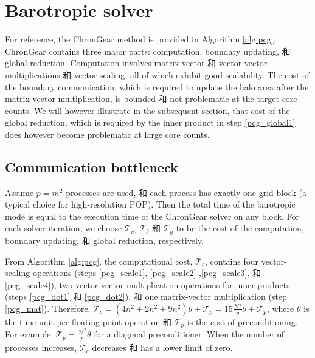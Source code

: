 \section{Barotropic solver} \label{se:baro}
 

 


For reference, the ChronGear method is provided in Algorithm
\ref{alg:pcg}.  ChronGear contains three major parts: computation,
boundary updating, 和 global reduction.  Computation involves
matrix-vector 和 vector-vector multiplications 和 vector scaling,
all of which exhibit good scalability.  The cost of the boundary communication, which
is required to update the halo area after the matrix-vector
multiplication, is bounded 和 not problematic at the target core counts.  We will however illustrate in the subsequent section, that cost of the global reduction, which is required by the inner product in step \ref{pcg_global1} does however become problematic at large core counts.


\subsection{Communication bottleneck}\label{se:bottleneck}
Assume $p=m^2$ processes are used, 和 each process has exactly one
grid block (a typical choice for high-resolution POP). Then the total time of the barotropic mode is equal to the
execution time of the ChronGear solver on any block.  For each solver
iteration, we choose $\mathcal{T}_c$, $\mathcal{T}_b$ 和
$\mathcal{T}_g$ to be the cost of the computation, boundary
updating, 和 global reduction, respectively.


From Algorithm \ref{alg:pcg}, the computational cost,
$\mathcal{T}_c$, contains four vector-scaling operations (steps
\ref{pcg_scale1}, \ref{pcg_scale2} ,\ref{pcg_scale3}, 和
\ref{pcg_scale4}), two vector-vector multiplication operations for
inner products (steps \ref{pcg_dot1} 和 \ref{pcg_dot2}), 和 one
matrix-vector multiplication (step \ref{pcg_mat}).  Therefore,
$\mathcal{T}_c= (4 n^2 +2n^2+ 9n^2)\theta + \mathcal{T}_{p}
=15\frac{\mathcal{N}^2}{p}\theta+\mathcal{T}_{p}$, where $\theta$ is
the time unit per floating-point operation 和 $\mathcal{T}_{p}$ is
the cost of preconditioning.  For example, $\mathcal{T}_{p} =
\frac{\mathcal{N}^2}{p}\theta$ for a diagonal preconditioner. When the
number of processes increases, $\mathcal{T}_c$ decreases 和 has a
lower limit of zero.

